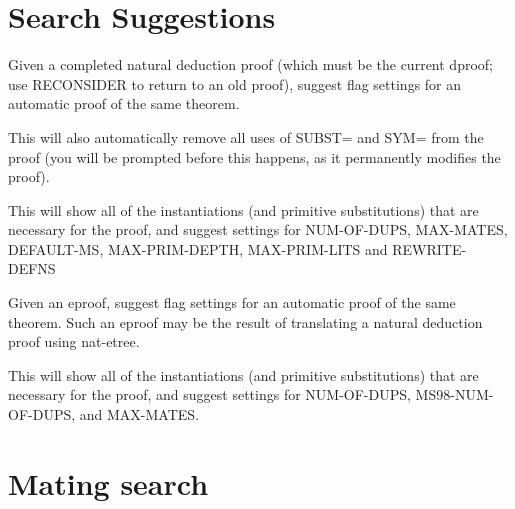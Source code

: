 \section{Search Suggestions}

\begin{description} 
\item[\parbox{\textwidth}{AUTO-SUGGEST}]  
Given a completed natural deduction proof (which must
be the current dproof; use RECONSIDER to return to an old proof),
suggest flag settings for an automatic proof of the same theorem.

This will also automatically remove all uses of SUBST=
and SYM= from the proof (you will be prompted before this
happens, as it permanently modifies the proof).

This will show all of the instantiations (and primitive substitutions)
that are necessary for the proof, and suggest settings for 
NUM-OF-DUPS, MAX-MATES, DEFAULT-MS, MAX-PRIM-DEPTH, MAX-PRIM-LITS 
and REWRITE-DEFNS

\item[\parbox{\textwidth}{ETR-AUTO-SUGGEST}]  
Given an eproof, suggest flag settings for 
an automatic proof of the same theorem.  Such an eproof may
be the result of translating a natural deduction proof using
nat-etree.

This will show all of the instantiations (and primitive substitutions)
that are necessary for the proof, and suggest settings for 
NUM-OF-DUPS, MS98-NUM-OF-DUPS, and MAX-MATES.
\item
\end{description}

\section{Mating search}

